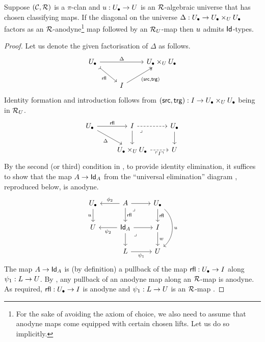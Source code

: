\begin{proposition}\label{prop:constructing-alg-id-types}
  Suppose $(\mathcal{C},\mathcal{R})$ is a $\pi$-clan and
  ${u} : {U_\bullet} \to U$ is an $\mathcal{R}$-algebraic universe that has chosen classifying maps.
  If the diagonal on the universe
  $\Delta : {U_\bullet} \to {U_\bullet} \times_U {U_\bullet}$
  factors as an $\mathcal{R}$-anodyne\footnote{
    For the sake of avoiding the axiom of choice,
    we also need to assume that anodyne maps
    come equipped with certain chosen lifts.
    Let us do so implicitly.} %
  map followed by an $\mathcal{R}_U$-map
  then ${u}$ admits $\mathsf{Id}$-types.
\end{proposition}
\begin{proof}
  Let us denote the given factorisation of $\Delta$ as follows.
  \[ \begin{tikzcd}
      \Ulow && {\Ulow \times_\U \Ulow} \\
      & I
      \arrow["\Delta", from=1-1, to=1-3]
      \arrow["\rfl"', tail, from=1-1, to=2-2]
      \arrow["{(\src,\trg)}"', two heads, from=2-2, to=1-3]
    \end{tikzcd} \]
  Identity formation and introduction follows from
  $(\mathop{\mathsf{src}},\mathop{\mathsf{trg}}) : I \to {{U_\bullet}\times_U{U_\bullet}}$
  being in $\mathcal{R}_U$.
  \[ \begin{tikzcd}
    \Ulow & I & \Ulow \\
    & {{\Ulow \times_\U \Ulow}} & \U
    \arrow["\rfl", from=1-1, to=1-2]
    \arrow["\Delta"', from=1-1, to=2-2]
    \arrow[dashed, from=1-2, to=1-3]
    \arrow[from=1-2, to=2-2]
    \arrow[from=1-3, to=2-3]
    \arrow["{\ulcorner I \urcorner}"', dashed, from=2-2, to=2-3]
    \arrow["\lrcorner"{anchor=center, pos=0.125}, draw=none, from=1-2, to=2-3]
  \end{tikzcd}\]
  By the second (or third) condition in ,
  to provide identity elimination,
  it suffices to show that the map $A \to \mathsf{Id}_A$
  from the ``universal elimination'' diagram
  , reproduced below, is anodyne.
  \[
    \begin{tikzcd}
    \Ulow & {{A}} & \Ulow \\
    \U & {\Id_{A}} & I \\
    & L & \U
    \arrow["\uu"', from=1-1, to=2-1]
    \arrow["{\phi_2}"', from=1-2, to=1-1]
    \arrow[from=1-2, to=1-3]
    \arrow["{\rfl}", from=1-2, to=2-2]
    \arrow["\lrcorner"{anchor=center, pos=0.125}, draw=none, from=1-2, to=2-3]
    \arrow["\rfl", from=1-3, to=2-3]
    \arrow["{\uu}", bend left = 50, from=1-3, to=3-3]
    \arrow["{\psi_2}", from=2-2, to=2-1]
    \arrow[from=2-2, to=2-3]
    \arrow[from=2-2, to=3-2]
    \arrow["\lrcorner"{anchor=center, pos=0.125}, draw=none, from=2-2, to=3-3]
    \arrow["\pp", from=2-3, to=3-3]
    \arrow["{\psi_1}"', from=3-2, to=3-3]
  \end{tikzcd}\]
  The map $A \to \mathsf{Id}_A$ is (by definition) a pullback of the map
  $\mathop{\mathsf{rfl}} : {U_\bullet} \to I$ along $\psi_1 : L \to U$.
  By ,
  any pullback of an anodyne map along an $\mathcal{R}$-map is anodyne.
  As required,
  $\mathop{\mathsf{rfl}} : {U_\bullet} \to I$ is anodyne
  and $\psi_1 : L \to U$ is an $\mathcal{R}$-map .
\end{proof}

